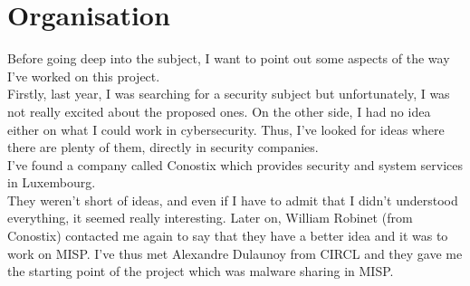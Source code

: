 \documentclass{eplmastersthesis}
\begin{document}
\section{Organisation}
Before going deep into the subject, I want to point out some aspects of the way I've worked on this project.\\
Firstly, last year, I was searching for a security subject but unfortunately, I was not really excited about the proposed ones. On the other side, I had no idea either on what I could work in cybersecurity. Thus, I've looked for ideas where there are plenty of them, directly in security companies.\\
I've found a company called Conostix which provides security and system services in Luxembourg.\\
They weren't short of ideas, and even if I have to admit that I didn't understood everything, it seemed really interesting. Later on, William Robinet (from Conostix) contacted me again to say that they have a better idea and it was to work on MISP. I've thus met Alexandre Dulaunoy from CIRCL and they gave me the starting point of the project which was malware sharing in MISP.\\
\end{document}
